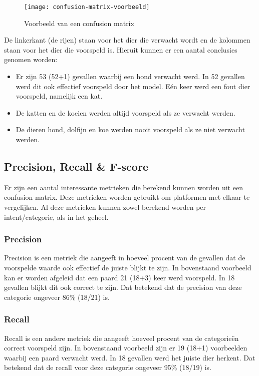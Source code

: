\begin{figure}[H]
    \label{fig:confusion-matrix-voorbeeld}
    \centering
    \texttt{[image: confusion-matrix-voorbeeld]}
    \caption{Voorbeeld van een confusion matrix}
\end{figure}

De linkerkant (de rijen) staan voor het dier die verwacht wordt en de kolommen staan voor het dier die voorspeld is. Hieruit kunnen er een aantal conclusies genomen worden:
\begin{itemize}
    \item Er zijn 53 (52+1) gevallen waarbij een hond verwacht werd. In 52 gevallen werd dit ook effectief voorspeld door het model. Eén keer werd een fout dier voorspeld, namelijk een kat.
    \item De katten en de koeien werden altijd voorspeld als ze verwacht werden.
    \item De dieren hond, dolfijn en koe werden nooit voorspeld als ze niet verwacht werden.
\end{itemize}

\subsection{Precision, Recall \& F-score}
\label{subsec:validatie-precision-recall-f-score}

Er zijn een aantal interessante metrieken die berekend kunnen worden uit een confusion matrix. Deze metrieken worden gebruikt om platformen met elkaar te vergelijken. Al deze metrieken kunnen zowel berekend worden per intent/categorie, als in het geheel.

\subsubsection{Precision}

Precision is een metriek die aangeeft in hoeveel procent van de gevallen dat de voorspelde waarde ook effectief de juiste blijkt te zijn.
In bovenstaand voorbeeld kan er worden afgeleid dat een paard 21 (18+3) keer werd voorspeld. In 18 gevallen blijkt dit ook correct te zijn. Dat betekend dat de precision van deze categorie ongeveer 86\% (18/21) is. 

\subsubsection{Recall}

Recall is een andere metriek die aangeeft hoeveel procent van de categorieën correct voorspeld zijn. In bovenstaand voorbeeld zijn er 19 (18+1) voorbeelden waarbij een paard verwacht werd. In 18 gevallen werd het juiste dier herkent. Dat betekend dat de recall voor deze categorie ongeveer 95\% (18/19) is.

